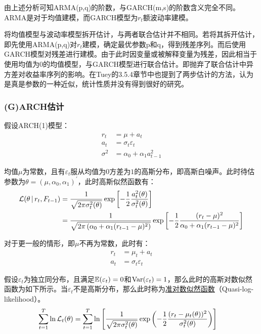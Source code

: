 \documentclass[11pt]{article}
\begin{document}
由上述分析可知ARMA(p,q)的阶数，与GARCH(m,s)的阶数含义完全不同。ARMA是对于均值建模，而GARCH模型为$r_t$额波动率建模。

将均值模型与波动率模型拆开估计，与两者联合估计并不相同。若将其拆开估计，即先使用ARMA(p,q)对$r_t$建模，确定最优参数p和q，得到残差序列。而后使用GARCH模型对残差进行建模。由于此时因变量或被解释变量为残差，因此相当于使用均值为0的均值模型，与GARCH模型进行联合估计。即抛弃了联合估计中异方差对收益率序列的影响。在Tuey的3.5.4章节中也提到了两步估计的方法，认为是真是参数的一种近似，统计性质并没有得到很好的研究。

\subsubsection{(G)ARCH估计}

假设ARCH(1)模型：
\begin{align*}
    r_t &= \mu + a_t \\
    a_t &= \sigma_t \varepsilon_t \\
    \sigma^2 &= \alpha_0 + \alpha_1 a_{t-1}^{2}
\end{align*}

均值$\mu$为常数，且有$\varepsilon_t$服从均值为$0$方差为$1$的高斯分布，即高斯白噪声。此时待估参数为$\theta = (\mu,\alpha_0,\alpha_1)^{'}$，此时高斯似然函数有：
\begin{align*}
    \mathcal{L}( \theta \,\vert\, r_t,F_{t-1})
    &= \frac{1}{\sqrt{2\pi\sigma_{t}^{2}(\theta)}} \exp \left[ -\frac{1}{2} \frac{a_{t}^{2}(\theta)}{\sigma_{t}^{2}(\theta)} \right] \\
    &= \frac{1}{\sqrt{2\pi\left(\alpha_0 + \alpha_1(r_{t-1}-\mu)^2\right)}} \exp \left[ -\frac{1}{2} \frac{(r_t - \mu)^2}{\alpha_0 + \alpha_1(r_{t-1}-\mu)^2} \right]
\end{align*}

对于更一般的情形，即$\mu$不再为常数，此时有：
\begin{align*}
    r_t &= \mu_t + a_t \\
    a_t &= \sigma_t \varepsilon_t
\end{align*}

假设$\varepsilon_t$为独立同分布，且满足$\mathbb{E}(\varepsilon_t)=0$和$\operatorname{Var}(\varepsilon_t)=1$，那么此时的高斯对数似然函数为如下所示。当$\varepsilon_t$不是高斯分布，那么此时称为\uline{准对数似然函数}（Quasi-log-likelihood）。
\begin{align*}
    \sum_{t=1}^{T} \ln \mathcal{L}_t(\theta)
    &= \sum_{t=1}^{T} \ln \left[ \frac{1}{\sqrt{2\pi\sigma_{t}^{2}(\theta)}} \exp \left( -\frac{1}{2} \frac{(r_t - \mu_t(\theta))^2}{\sigma_{t}^{2}(\theta)} \right) \right]
\end{align*}
\end{document}
